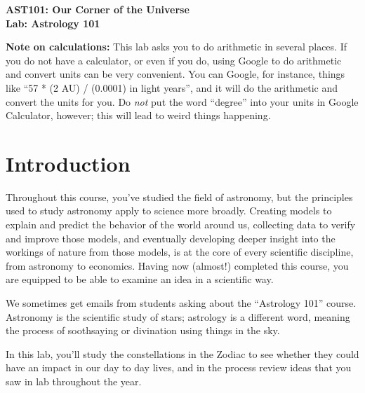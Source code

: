 \documentclass[11pt]{article}
\begin{document}
\begin{center}
\textbf{\Large
AST101: Our Corner of the Universe \\
\vspace*{0.1cm}
Lab: Astrology 101
}
\vspace{1em}




\end{center}

{\bf Note on calculations:} This lab asks you to do arithmetic in several places. If you do not have a calculator, or even if you do, using Google to do arithmetic and convert units can be very convenient. You can Google, for instance, things like ``57 * (2 AU) / (0.0001) in light years'', and it will do the arithmetic and convert the units for you. Do {\it not} put the word ``degree'' into your units in Google Calculator, however; this will lead to weird things happening.

\vspace*{0.5cm}



\section{Introduction}

Throughout this course, you've studied the field of astronomy, but the principles used to study astronomy apply to science more broadly. Creating models to explain and predict the behavior of the world around us, collecting data to verify and improve those models, and eventually developing deeper insight into the workings of nature from those models, is at the core of every scientific discipline, from astronomy to economics. Having now (almost!) completed this course, you are equipped to be able to examine an idea in a scientific way. 

We sometimes get emails from students asking about the ``Astrology 101'' course. Astronomy is the scientific study of stars; astrology is a different word, meaning the process of soothsaying or divination using things in the sky.

In this lab, you'll study the constellations in the Zodiac to see whether they could have an impact in our day to day lives, and in the process review ideas that you saw in lab throughout the year. \\ \\ \\
\end{document}

